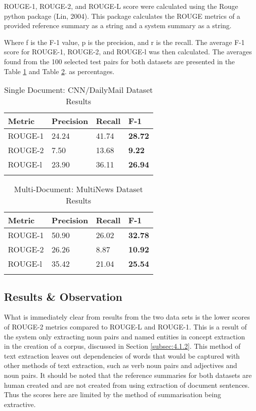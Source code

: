 ROUGE-1, ROUGE-2, and ROUGE-L score were calculated using the Rouge python package (Lin, 2004). This package calculates the ROUGE metrics of a provided reference summary as a string and a system summary as a string. 

Where f is the F-1 value, p is the precision, and r is the recall. The average F-1 score for ROUGE-1, ROUGE-2, and ROUGE-l was then calculated. The averages found from the 100 selected test pairs for both datasets are presented in the Table \ref{tab:singleResults} and Table \ref{tab:multiResults}. as percentages.

\begin{table}[h]
    \caption{Single Document: CNN/DailyMail Dataset Results}
    \label{tab:singleResults}
    \centering
    \begin{tabular}{l l l l}
    \toprule
    \textbf{Metric} & \textbf{Precision} & \textbf{Recall} & \textbf{F-1}\\
    \midrule
    ROUGE-1 & 24.24 & 41.74 & \textbf{28.72}\\
    ROUGE-2 & 7.50 & 13.68 & \textbf{9.22}\\
    ROUGE-l & 23.90 & 36.11 & \textbf{26.94}\\
    \bottomrule\\
    \end{tabular}
\end{table}

\begin{table}[h]
    \caption{Multi-Document: MultiNews Dataset Results}
    \label{tab:multiResults}
    \centering
    \begin{tabular}{l l l l}
    \toprule
    \textbf{Metric} & \textbf{Precision} & \textbf{Recall} & \textbf{F-1}\\
    \midrule
    ROUGE-1 & 50.90 & 26.02 & \textbf{32.78}\\
    ROUGE-2 & 26.26 & 8.87 & \textbf{10.92}\\
    ROUGE-l & 35.42 & 21.04 & \textbf{25.54}\\
    \bottomrule\\
    \end{tabular}
\end{table}

\subsection{Results \& Observation}
What is immediately clear from results from the two data sets is the lower scores of ROUGE-2 metrics compared to ROUGE-L and ROUGE-1. This is a result of the system only extracting noun pairs and named entities in concept extraction in the creation of a corpus, discussed in Section \ref{subsec:4.1.2}. This method of text extraction leaves out dependencies of words that would be captured with other methods of text extraction, such as verb noun pairs and adjectives and noun pairs. It should be noted that the reference summaries for both datasets are human created and are not created from using extraction of document sentences. Thus the scores here are limited by the method of summarisation being extractive. 

